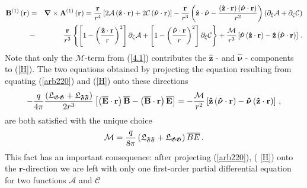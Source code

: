 \documentclass[12pt]{article}
\begin{document}
\begin{eqnarray}
\mathbf{B}^{\left( 1\right) }\left( \mathbf{r}\right)  &=&\boldsymbol{\nabla 
}\times \mathbf{A}^{\left( 1\right) }\left( \mathbf{r}\right) =\frac{\mathbf{%
r}}{r^{4}}\left[ 2\mathcal{A}\left( \mathbf{\hat{z}}\cdot \mathbf{r}\right)
+2\mathcal{C}\left( \boldsymbol{\hat{\nu}}\cdot \mathbf{r}\right) \right] -%
\frac{\mathbf{r}}{r^{3}}\left( \mathbf{\hat{z}}\cdot \boldsymbol{\hat{\nu}}-%
\frac{\left( \mathbf{\hat{z}}\cdot \mathbf{r}\right) \left( \boldsymbol{\hat{%
\nu}}\cdot \mathbf{r}\right) }{r^{2}}\right) \left( \partial _{\xi }\mathcal{%
A}+\partial _{\zeta }\mathcal{C}\right)   \notag \\
&-&\frac{\mathbf{r}}{r^{3}}\left\{ \left[ 1-\left( \frac{\mathbf{\hat{z}}%
\cdot \mathbf{r}}{r}\right) ^{2}\right] \partial _{\zeta }\mathcal{A}+\left[
1-\left( \frac{\boldsymbol{\hat{\nu}}\cdot \mathbf{r}}{r}\right) ^{2}\right]
\partial _{\xi }\mathcal{C}\right\} +\frac{\mathcal{M}}{r^{3}}\left[ 
\boldsymbol{\hat{\nu}}\left( \mathbf{\hat{z}}\cdot \mathbf{r}\right) -%
\mathbf{\hat{z}}\left( \boldsymbol{\hat{\nu}}\cdot \mathbf{r}\right) \right]
\,.  \label{H}
\end{eqnarray}%
Note that only the $\mathcal{M}$-term from (\ref{4.1}) contributes the $%
\mathbf{\hat{z}}$ - and $\boldsymbol{\hat{\nu}}$ - components to (\ref{H}).
The two equations obtained by projecting the equation resulting from
equating (\ref{arb220}) and (\ref{H}) onto these directions%
\begin{equation*}
-\frac{q}{4\pi }\frac{\left( \mathfrak{L}_{\mathfrak{GG}}+\mathfrak{L}_{%
\mathfrak{FF}}\right) }{2r^{3}}\left[ \left( \overline{\mathbf{E}}\cdot 
\mathbf{r}\right) \mathbf{\overline{B}}-\left( \mathbf{\overline{B}}\cdot 
\mathbf{r}\right) \overline{\mathbf{E}}\right] =-\frac{\mathcal{M}}{r^{2}}%
\left[ \mathbf{\hat{z}}\left( \boldsymbol{\hat{\nu}}\cdot \mathbf{r}\right) -%
\boldsymbol{\hat{\nu}}\left( \mathbf{\hat{z}}\cdot \mathbf{r}\right) \right]
\,,
\end{equation*}%
are both satisfied with the unique choice%
\begin{equation}
\mathcal{M}=\frac{q}{8\pi }\left( \mathfrak{L}_{\mathfrak{FF}}+\mathfrak{L}_{%
\mathfrak{GG}}\right) \overline{B}\overline{E}\,.  \label{4.3}
\end{equation}%
This fact has an important consequence: after projecting (\ref{arb220}), (%
\ref{H}) onto the $\mathbf{r}$-direction we are left with only one
first-order partial differential equation for two functions $\mathcal{A}$
and $\mathcal{C}$%
\end{document}
